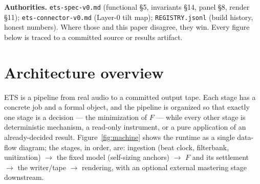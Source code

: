 \documentclass[11pt]{article}
\newcommand{\code}[1]{\texttt{\small #1}}
\begin{document}
\medskip\noindent\textbf{Authorities.} \code{ets-spec-v0.md} (functional \S5,
invariants \S14, panel \S8, render \S11); \code{ets-connector-v0.md} (Layer-0 tilt
map); \code{REGISTRY.jsonl} (build history, honest numbers). Where those and this
paper disagree, they win. Every figure below is traced to a committed source or
results artifact.

\clearpage
\section{Architecture overview}

ETS is a pipeline from real audio to a committed output tape. Each stage has a
concrete job and a formal object, and the pipeline is organized so that exactly
one stage is a decision --- the minimization of $F$ --- while every other stage is
deterministic mechanism, a read-only instrument, or a pure application of an
already-decided result. Figure~\ref{fig:machine} shows the runtime as a single
data-flow diagram; the stages, in order, are: ingestion (beat clock, filterbank,
unitization) $\to$ the fixed model (self-sizing anchors) $\to$ $F$ and its
settlement $\to$ the writer/tape $\to$ rendering, with an optional external
mastering stage downstream.

\end{document}
